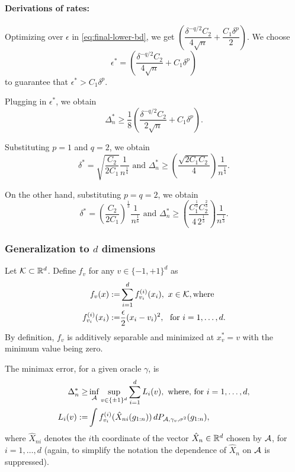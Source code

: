\paragraph{Derivations of rates:}
 Optimizing over $\epsilon$ in \eqref{eq:final-lower-bd}, we get
$ \left(\dfrac{\delta^{-q/2}C_2}{4\sqrt{n}} + \dfrac{C_1\delta^p}{2}\right)$. We choose
\[
\epsilon^* = \left(\dfrac{\delta^{-q/2}C_2}{4\sqrt{n}} + C_1\delta^p\right)
\]
to guarantee that $\epsilon^*>C_1 \delta^p$.

 Plugging in $\epsilon^*$, we obtain
 \[
 \Delta_n^*
 \ge \frac18 \left(\dfrac{\delta^{-q/2}C_2}{2\sqrt{n}} + C_1\delta^p \right).
 \]

Substituting $p=1$ and $q=2$, we obtain
\[
\delta^*= \sqrt{\dfrac{C_2}{2C_1}}\dfrac{1}{n^{\frac{1}{4}}} \text{ and } 
\Delta_n^* \ge \left(\dfrac{\sqrt{2C_1C_2}}{4}\right)\dfrac{1}{n^{\frac{1}{4}}}.
\]

On the other hand, substituting $p=q=2$, we obtain
\[
\delta^*= \left(\dfrac{C_2}{2C_1}\right)^{\frac{1}{3}}\dfrac{1}{n^{\frac{1}{6}}} \text{ and } \Delta_n^* \ge \left(\dfrac{C_1^{\frac{1}{3}}C_2^{\frac{2}{3}}}{4\, 2^{\frac{1}{3}}}\right)\dfrac{1}{n^{\frac{1}{3}}}.
\]

\subsubsection{Generalization to $d$ dimensions}

Let $\mathcal{K} \subset \mathbb{R}^d$.
Define $f_v$ for any $v\in \{-1,+1\}^d$ as 
\begin{align*}
  f_v(x) :=& \sum_{i=1}^d f^{(i)}_{v_i}(x_i), \,\, x \in \mathcal{K}, \text{where}\\
  f^{(i)}_{v_i}(x_i) :=& \dfrac{\epsilon}{2} (x_i - v_i)^2, \,\, \text{ for } i=1,\ldots,d.
\end{align*}
By definition, $f_v$ is additively separable and minimized at $x^*_v=v$ with the minimum value being zero.

The minimax error, for a given oracle $\gamma$, is 
\begin{align*}
 \Delta_n^* \ge& \inf_{\mathcal{A}}  \sup_{v\in \{\pm 1 \}^d}\sum_{i=1}^d L_i(v), \text{ where, for } i=1,\ldots,d,\\
 L_i(v) := & \int f^{(i)}_{v_i}(\hat X_{ni}(g_{1:n}) )\, dP_{\mathcal{A},\gamma_v,\sigma^2}(g_{1:n}),  
\end{align*}
where $\hat{X}_{ni}$ denotes the $i$th coordinate of the vector $\hat{X}_n \in \mathbb{R}^d$ chosen by $\mathcal{A}$, for $i=1,\ldots,d$
(again, to simplify the notation the dependence of $\hat{X}_n$ on $\mathcal{A}$ is suppressed).

